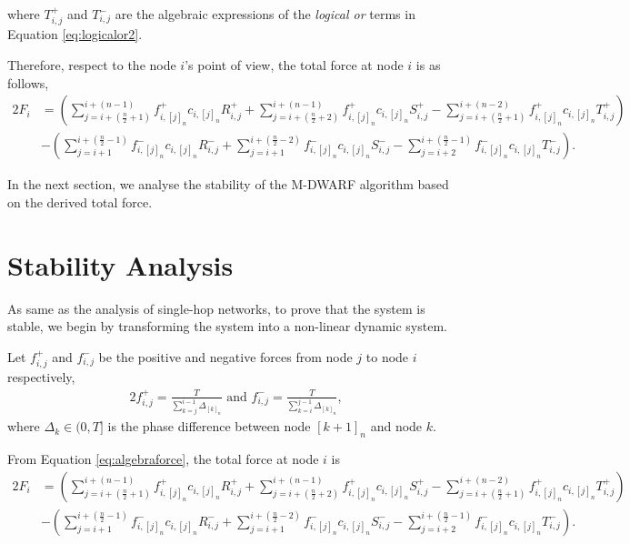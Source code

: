 where $T_{i,j}^+$ and $T_{i,j}^-$ are the algebraic expressions of the \textit{logical or} terms in Equation \ref{eq:logicalor2}.

Therefore, respect to the node $i$'s point of view, the total force at node $i$ is as follows,
\begin{alignat}{2}
F_i &= \left ( \sum_{j= i + (\frac{n}{2} + 1)}^{i+(n-1)}  f_{i,[j]_n}^{+}c_{i,[j]_n}R_{i,j}^+ + \sum_{j= i + (\frac{n}{2} + 2)}^{i+(n-1)}  f_{i,[j]_n}^{+}c_{i,[j]_n}S_{i,j}^+ - \sum_{j= i + (\frac{n}{2} + 1)}^{i+(n-2)}  f_{i,[j]_n}^{+}c_{i,[j]_n}T_{i,j}^+\right) \nonumber \\
&- \left ( \sum_{j= i + 1}^{i+(\frac{n}{2}-1)}  f_{i,[j]_n}^{-}c_{i,[j]_n}R_{i,j}^- + 
\sum_{j= i + 1}^{i+(\frac{n}{2}-2)}  f_{i,[j]_n}^{-}c_{i,[j]_n}S_{i,j}^- -
\sum_{j= i + 2}^{i+(\frac{n}{2}-1)}  f_{i,[j]_n}^{-}c_{i,[j]_n}T_{i,j}^- \right).
\label{eq:algebraforce}
\end{alignat}

In the next section, we analyse the stability of the M-DWARF algorithm based on the derived total force.


\section{Stability Analysis}
As same as the analysis of single-hop networks, to prove that the system is stable, we begin by transforming the system into a non-linear dynamic system. 

Let $f_{i,j}^{+}$ and $f_{i,j}^{-}$ be the positive and negative forces from node $j$ to node $i$ respectively,
\begin{alignat}{2}
f_{i,j}^{+} = \frac{T}{\sum_{k=j}^{i-1}\Delta_{[k]_n}} \text{ and } f_{i,j}^{-} = \frac{T}{\sum_{k=i}^{j-1}\Delta_{[k]_n}},  
\end{alignat}
where $\Delta_k \in (0, T]$ is the phase difference between node $[k + 1]_n$ and node $k$.

From Equation \ref{eq:algebraforce}, the total force at node $i$ is
\begin{alignat}{2}
F_i &= \left ( \sum_{j= i + (\frac{n}{2} + 1)}^{i+(n-1)}  f_{i,[j]_n}^{+}c_{i,[j]_n}R_{i,j}^+ + \sum_{j= i + (\frac{n}{2} + 2)}^{i+(n-1)}  f_{i,[j]_n}^{+}c_{i,[j]_n}S_{i,j}^+ - \sum_{j= i + (\frac{n}{2} + 1)}^{i+(n-2)}  f_{i,[j]_n}^{+}c_{i,[j]_n}T_{i,j}^+\right) \nonumber \\
&- \left ( \sum_{j= i + 1}^{i+(\frac{n}{2}-1)}  f_{i,[j]_n}^{-}c_{i,[j]_n}R_{i,j}^- + 
\sum_{j= i + 1}^{i+(\frac{n}{2}-2)}  f_{i,[j]_n}^{-}c_{i,[j]_n}S_{i,j}^- -
\sum_{j= i + 2}^{i+(\frac{n}{2}-1)}  f_{i,[j]_n}^{-}c_{i,[j]_n}T_{i,j}^- \right).
\end{alignat}


